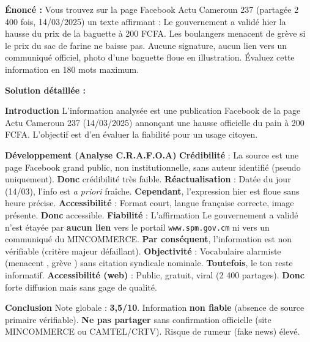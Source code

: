 \documentclass[11pt]{article}
\begin{document}
\begin{exoresolu}
\textbf{Énoncé :} Vous trouvez sur la page Facebook \guillemotleft Actu Cameroun 237 \guillemotright (partagée 2 400 fois, 14/03/2025) un texte affirmant : \guillemotleft Le gouvernement a validé hier la hausse du prix de la baguette à 200 FCFA. Les boulangers menacent de grève si le prix du sac de farine ne baisse pas. \guillemotright Aucune signature, aucun lien vers un communiqué officiel, photo d'une baguette floue en illustration. Évaluez cette information en 180 mots maximum.

\tcblower
\textbf{Solution détaillée :}

\textbf{Introduction}
L'information analysée est une publication Facebook de la page \guillemotleft Actu Cameroun 237 \guillemotright (14/03/2025) annonçant une hausse officielle du pain à 200 FCFA. L'objectif est d'en évaluer la fiabilité pour un usage citoyen.

\textbf{Développement (Analyse C.R.A.F.O.A)}
\textbf{Crédibilité} : La source est une page Facebook grand public, non institutionnelle, sans auteur identifié (pseudo uniquement). \textbf{Donc} crédibilité très faible.
\textbf{Réactualisation} : Datée du jour (14/03), l'info est \emph{a priori} fraîche. \textbf{Cependant}, l'expression \guillemotleft hier \guillemotright est floue sans heure précise.
\textbf{Accessibilité} : Format court, langue française correcte, image présente. \textbf{Donc} accessible.
\textbf{Fiabilité} : L'affirmation \guillemotleft Le gouvernement a validé \guillemotright n'est étayée par \textbf{aucun lien} vers le portail \texttt{www.spm.gov.cm} ni vers un communiqué du MINCOMMERCE. \textbf{Par conséquent}, l'information est non vérifiable (critère majeur défaillant).
\textbf{Objectivité} : Vocabulaire alarmiste (\guillemotleft menacent \guillemotright, \guillemotleft grève \guillemotright) sans citation syndicale nominale. \textbf{Toutefois}, le ton reste informatif.
\textbf{Accessibilité (web)} : Public, gratuit, viral (2 400 partages). \textbf{Donc} forte diffusion mais sans gage de qualité.

\textbf{Conclusion}
Note globale : \textbf{3,5/10}. Information \textbf{non fiable} (absence de source primaire vérifiable). \textbf{Ne pas partager} sans confirmation officielle (site MINCOMMERCE ou CAMTEL/CRTV). Risque de rumeur (fake news) élevé.
\end{exoresolu}
\end{document}
